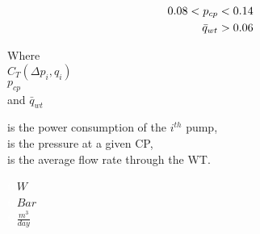 \begin{align*}\vspace{0.1mm}
0.08 < p_{cp} < 0.14 \\
\bar{q}_{wt} > 0.06 
\end{align*}

\begin{minipage}[t]{0.20\textwidth}

Where\\
\hspace*{8mm} $C_T(\Delta{p}_i,q_i)$ \\
\hspace*{8mm} $p_{cp}$ \\
and \hspace*{0.7mm} $\bar{q}_{wt}$	
\end{minipage}
\begin{minipage}[t]{0.68\textwidth}
\vspace*{2mm}
is the power consumption of the $i^{th}$ pump,\\
is the pressure at a given CP,\\
is the average flow rate through the WT.
\end{minipage}
\begin{minipage}[t]{0.10\textwidth}
\vspace*{2mm}
\textcolor{White}{te}$\unit{W}$\\
\textcolor{White}{te}$\unit{Bar}$\\
\textcolor{White}{te}$\unit{\frac{m^3}{day}}$
\end{minipage}
